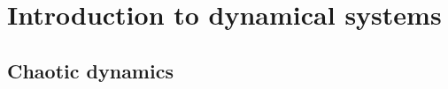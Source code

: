 \documentclass[11pt,fleqn]{book} %
\begin{document}



\pagestyle{empty} %

\tableofcontents %

\cleardoublepage %

\pagestyle{fancy} %




\part{Introduction to dynamical systems}









\chapter{Chaotic dynamics}








\end{document}
